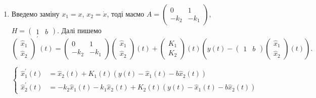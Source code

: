 \begin{solution}
\begin{enumerate}
        \item Введемо заміну $x_1 = x$, $x_2 = \dot x$, тоді маємо $A = \begin{pmatrix} 0 & 1 \\ - k_2 & - k_1 \end{pmatrix}$, $H = \begin{pmatrix} 1 & b \end{pmatrix}$. Далі пишемо
        \[ \begin{pmatrix} \hat x_1 \\ \hat x_2 \end{pmatrix}^\prime (t) = \begin{pmatrix} 0 & 1 \\ - k_2 & - k_1 \end{pmatrix} \begin{pmatrix} \hat x_1 \\ \hat x_2 \end{pmatrix} (t) + \begin{pmatrix} K_1 \\ K_2 \end{pmatrix} (t) \left( y(t) - \begin{pmatrix} 1 & b \end{pmatrix} \begin{pmatrix} \hat x_1 \\ \hat x_2 \end{pmatrix} (t) \right) .\]
        
        \begin{equation*}
            \left\{
                \begin{aligned}
                    \hat x_1^\prime (t) &= \hat x_2 (t) + K_1 (t) (y(t) - \hat x_1(t) - b \hat x_2 (t)) \\
                    \hat x_2^\prime (t) &= - k_2 \hat x_1(t) - k_1 \hat x_2 (t) + K_2 (t) (y(t) - \hat x_1(t) - b \hat x_2 (t))
                \end{aligned}
            \right.
        \end{equation*}
    \end{enumerate}
\end{solution}

\begin{problem}
\end{problem}

\begin{solution}
\end{solution}

\begin{problem}
\end{problem}

\begin{solution}
\end{solution}
